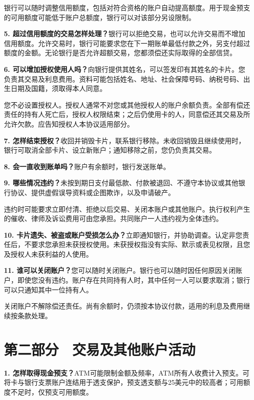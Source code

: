 \documentclass[UTF8,fontset=none,11pt,a4paper]{ctexart}
\begin{document}
银行可以随时调整信用额度，包括对符合资格的账户自动提高额度。用于现金预支的可用额度可能低于账户总额度，银行可以对该部分\allowbreak\mbox{另设限制。}


\textbf{5. 超过信用额度的交易怎样处理？}银行可以拒绝交易，也可以允许交易而不增加信用额度。允许交易时，银行可能要求您在下一期账单最低付款之外，另支付超过额度的金额。无论银行是否允许超额交易，您都须偿还实际取得的\allowbreak\mbox{全部信贷。}


\textbf{6. 可以增加授权使用人吗？}向银行提供其姓名，可以签发印有其姓名的卡片。您负责其交易及利息费用。资料可能包括姓名、地址、社会保障号码、纳税号码、出生日期及国籍，须取得本\allowbreak\mbox{人同意。}


您不必设置授权人。授权人通常不对您或其他授权人的账户余额负责。全部有偿还责任的持有人死亡后，授权人权限结束；之后仍使用卡的人，同意偿还其交易及所允许欠款。应告知授权人本协议\allowbreak\mbox{适用部分。}


\textbf{7. 怎样结束授权？}收回并销毁卡片，联系银行移除。未收回销毁且继续使用时，银行可取消全部卡片、设立新账户；通知移除之前，您仍负\allowbreak\mbox{责其交易。}


\textbf{8. 会一直收到账单吗？}账户有余额时，银行\allowbreak\mbox{发送账单。}


\textbf{9. 哪些情况违约？}未按到期日支付最低款、付款被退回、不遵守本协议或其他银行协议、提供虚假误导资料或企图欺诈，以及\allowbreak\mbox{申请破产。}


违约时可能要求立即付清、拒绝以后交易、关闭本账户或其他账户。执行权利产生的催收、律师及诉讼费用可由您承担。共同账户一人违约视为\allowbreak\mbox{全体违约。}


\textbf{10. 卡片遗失、被盗或账户受损怎么办？}立即通知银行，并协助调查。认定非您责任后，不要求您承担未获授权使用。未获授权指没有实际、默示或表见权限，且您及授权人未获利益\allowbreak\mbox{的人使用。}


\textbf{11. 谁可以关闭账户？}您可以随时关闭账户。银行也可以随时因任何原因关闭账户，即使您没有违约。账户存在共同持有人时，其中任何一人可以要求取消；银行可以只通知其中一\allowbreak\mbox{位持有人。}


关闭账户不解除偿还责任。尚有余额时，仍须按本协议付款，适用的利息及费用继续按\allowbreak\mbox{条款处理。}


\section*{第二部分　交易及其他账户活动}
\textbf{1. 怎样取得现金预支？}ATM可能限制金额及频率，ATM所有人收费计入预支。可将卡与银行支票账户连结用于透支保护，预支透支额与25美元中的较高者；可用额度不足时，仅预支\allowbreak\mbox{可用额度。}
\end{document}
